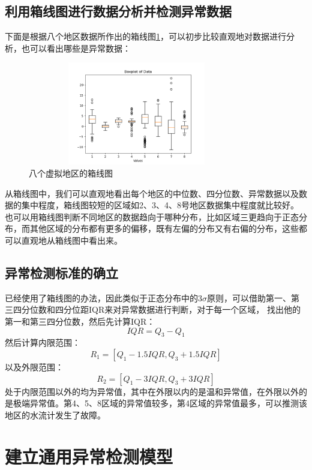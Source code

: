 \documentclass[UTF8]{article}
\begin{document}
		\subsection{利用箱线图进行数据分析并检测异常数据}
			下面是根据八个地区数据所作出的箱线图\ref{Box}，可以初步比较直观地对数据进行分析，也可以看出哪些是异常数据：
			\begin{figure}[!h]
				\centering %
				\includegraphics[height=4.5cm,width=9.5cm]{pictures/BoxPlot.png}
				\caption{八个虚拟地区的箱线图}
				\label{Box}
			\end{figure}
			\par 从箱线图中，我们可以直观地看出每个地区的中位数、四分位数、异常数据以及数据的集中程度，箱线图较短的区域如2、3、4、8号地区数据集中程度就比较好。
			也可以用箱线图判断不同地区的数据趋向于哪种分布，比如区域三更趋向于正态分布，而其他区域的分布都有更多的偏移，既有左偏的分布又有右偏的分布，这些都可以直观地从箱线图中看出来。
		\subsection{异常检测标准的确立}
			已经使用了箱线图的办法，因此类似于正态分布中的3$\sigma$原则，可以借助第一、第三四分位数和四分位距IQR来对异常数据进行判断，对于每一个区域，
			找出他的第一和第三四分位数，然后先计算IQR：
			$$
			IQR=Q_3-Q_1
			$$
			然后计算内限范围：
			$$
			R_1=\left[ Q_1-1.5IQR,Q_3+1.5IQR \right] 
			$$
			以及外限范围：
			$$
			R_2=\left[ Q_1-3IQR,Q_3+3IQR \right] 
			$$
			处于内限范围以外的均为异常值，其中在外限以内的是温和异常值，在外限以外的是极端异常值。第4、5、8区域的异常值较多，第4区域的异常值最多，可以推测该地区的水流计发生了故障。
	\section{建立通用异常检测模型}
\end{document}
